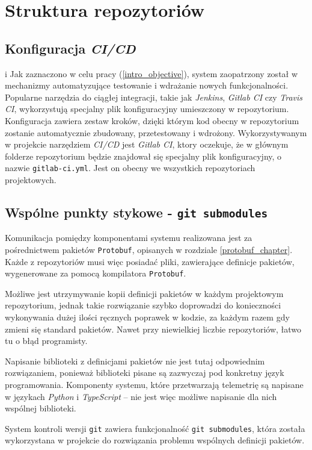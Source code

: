 \section{Struktura repozytoriów} \label{repo_structure}

\subsection{Konfiguracja \textit{CI/CD}}
i
Jak zaznaczono w celu pracy (\ref{intro_objective}), system zaopatrzony został w  
mechanizmy automatyzujące testowanie i wdrażanie nowych 
funkcjonalności. Popularne narzędzia do ciągłej integracji, takie jak
\textit{Jenkins}, \textit{Gitlab CI} czy \textit{Travis CI}, wykorzystują specjalny
plik konfiguracyjny umieszczony w repozytorium. Konfiguracja zawiera zestaw kroków,
dzięki którym kod obecny w repozytorium zostanie automatycznie
zbudowany, przetestowany i wdrożony. Wykorzystywanym w projekcie narzędziem \textit{CI/CD}
jest \textit{Gitlab CI}, ktory oczekuje, że w głównym folderze repozytorium będzie 
znajdował się specjalny plik konfiguracyjny, o nazwie \texttt{gitlab-ci.yml}. 
Jest on obecny we wszystkich repozytoriach projektowych.


\subsection{Wspólne punkty stykowe - \texttt{git submodules}}

Komunikacja pomiędzy komponentami systemu realizowana jest za pośrednictwem
pakietów \texttt{Protobuf}, opisanych w rozdziale \ref{protobuf_chapter}.
Każde z repozytoriów musi więc posiadać pliki, zawierające definicje pakietów,
wygenerowane za pomocą kompilatora \texttt{Protobuf}. 

Możliwe jest utrzymywanie kopii definicji pakietów w każdym projektowym repozytorium,
jednak takie rozwiązanie szybko doprowadzi do konieczności wykonywania dużej ilości
ręcznych poprawek w kodzie, za każdym razem gdy zmieni się standard pakietów. 
Nawet przy niewielkiej liczbie repozytoriów, łatwo tu o błąd programisty. 

Napisanie biblioteki z definicjami pakietów nie jest tutaj odpowiednim rozwiązaniem, 
ponieważ biblioteki pisane są zazwyczaj pod konkretny język programowania. Komponenty
systemu, które przetwarzają telemetrię są napisane w językach \textit{Python} i 
\textit{TypeScript} -- nie jest więc możliwe napisanie dla nich wspólnej biblioteki.

System kontroli wersji \texttt{git} zawiera funkcjonalność
\texttt{git submodules}\cite{git_submodules}, która została wykorzystana
w projekcie do rozwiązania problemu wspólnych definicji pakietów.

